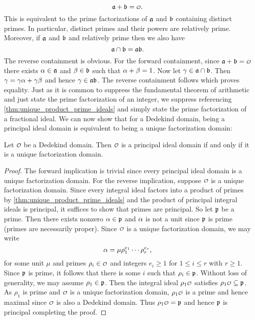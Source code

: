     \[
      \mf{a}+\mf{b} = \smc{O}.
    \]
    This is equivalent to the prime factorizations of $\mathfrak{a}$ and $\mathfrak{b}$ containing distinct primes. In particular, distinct primes and their powers are relatively prime. Moreover, if $\mathfrak{a}$ and $\mathfrak{b}$ and relatively prime then we also have
    \[
      \mathfrak{a} \cap \mathfrak{b} = \mathfrak{a}\mathfrak{b}.
    \]
    The reverse containment is obvious. For the forward containment, since $\mf{a}+\mf{b} = \smc{O}$ there exists $\alpha \in \mathfrak{a}$ and $\beta \in \mathfrak{b}$ such that $\alpha+\beta = 1$. Now let $\gamma \in \mathfrak{a} \cap \mathfrak{b}$. Then $\gamma = \gamma\alpha+\gamma\beta$ and hence $\gamma \in \mathfrak{a}\mathfrak{b}$. The reverse containment follows which proves equality. Just as it is common to suppress the fundamental theorem of arithmetic and just state the prime factorization of an integer, we suppress referencing \cref{thm:unique_product_prime_ideals} and simply state the prime factorization of a fractional ideal. We can now show that for a Dedekind domain, being a principal ideal domain is equivalent to being a unique factorization domain:

    \begin{proposition}\label{prop:UDF_PID_equivalence_for_Dedekind}
      Let $\smc{O}$ be a Dedekind domain. Then $\smc{O}$ is a principal ideal domain if and only if it is a unique factorization domain.
    \end{proposition}
    \begin{proof}
      The forward implication is trivial since every principal ideal domain is a unique factorization domain. For the reverse implication, suppose $\smc{O}$ is a unique factorization domain. Since every integral ideal factors into a product of primes by \cref{thm:unique_product_prime_ideals} and the product of principal integral ideals is principal, it suffices to show that primes are principal. So let $\mathfrak{p}$ be a prime. Then there exists nonzero $\alpha \in \mathfrak{p}$ and $\alpha$ is not a unit since $\mathfrak{p}$ is prime (primes are necessarily proper). Since $\smc{O}$ is a unique factorization domain, we may write
      \[
        \alpha = \mu\rho_{1}^{e_{1}} \cdots \rho_{r}^{e_{r}},
      \]
      for some unit $\mu$ and primes $\rho_{i} \in \smc{O}$ and integers $e_{i} \ge 1$ for $1 \le i \le r$ with $r \ge 1$. Since $\mathfrak{p}$ is prime, it follows that there is some $i$ such that $\rho_{i} \in \mathfrak{p}$. Without loss of generality, we may assume $\rho_{1} \in \mathfrak{p}$. Then the integral ideal $\rho_{1}\smc{O}$ satisfies $\rho_{1}\smc{O} \subseteq \mf{p}$. As $\rho_{1}$ is prime and $\smc{O}$ is a unique factorization domain, $\rho_{1}\smc{O}$ is a prime and hence maximal since $\smc{O}$ is also a Dedekind domain. Thus $\rho_{1}\smc{O} = \mf{p}$ and hence $\mathfrak{p}$ is principal completing the proof.
    \end{proof}

